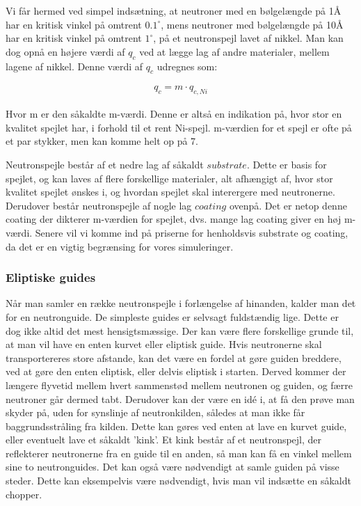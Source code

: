 \documentclass[12pt,oneside,a4paper]{article}
\begin{document}
{{{{{Vi får hermed ved simpel indsætning, at neutroner med en bølgelængde på 1Å har en kritisk vinkel på omtrent $0.1^∘$, mens neutroner med bølgelængde på 10Å har en kritisk vinkel på omtrent $1^∘$, på et neutronspejl lavet af nikkel.
Man kan dog opnå en højere værdi af $q_c$ ved at lægge lag af andre materialer, mellem lagene af nikkel. Denne værdi af $q_c$ udregnes som:

\begin{align}
q_c=m \cdot q_{c,Ni}
\end{align}

Hvor m er den såkaldte m-værdi. Denne er altså en indikation på, hvor stor en kvalitet spejlet har, i forhold til et rent Ni-spejl. m-værdien for et spejl er ofte på et par stykker, men kan komme helt op på 7. \cite{lefmann_arleth_kirkensgaard_lebech_thomsen}

Neutronspejle består af et nedre lag af såkaldt $substrate$. Dette er basis for spejlet, og kan laves af flere forskellige materialer, alt afhængigt af, hvor stor kvalitet spejlet ønskes i, og hvordan spejlet skal interergere med neutronerne. Derudover består neutronspejle af nogle lag $coating$ ovenpå. Det er netop denne coating der dikterer m-værdien for spejlet, dvs. mange lag coating giver en høj m-værdi. Senere vil vi komme ind på priserne for henholdsvis substrate og coating, da det er en vigtig begrænsing for vores simuleringer.

\subsubsection{Eliptiske guides}
Når man samler en række neutronspejle i forlængelse af hinanden, kalder man det for en neutronguide. De simpleste guides er selvsagt fuldstændig lige. Dette er dog ikke altid det mest hensigtsmæssige. Der kan være flere forskellige grunde til, at man vil have en enten kurvet eller eliptisk guide. Hvis neutronerne skal transportereres store afstande, kan det være en fordel at gøre guiden breddere, ved at gøre den enten eliptisk, eller delvis eliptisk i starten. Derved kommer der længere flyvetid mellem hvert sammenstød mellem neutronen og guiden, og færre neutroner går dermed tabt. Derudover kan der være en idé i, at få den prøve man skyder på, uden for synslinje af neutronkilden, således at man ikke får baggrundsstråling fra kilden. Dette kan gøres ved enten at lave en kurvet guide, eller eventuelt lave et såkaldt 'kink'. Et kink består af et neutronspejl, der reflekterer neutronerne fra en guide til en anden, så man kan få en vinkel mellem sine to neutronguides. 
Det kan også være nødvendigt at samle guiden på visse steder. Dette kan eksempelvis være nødvendigt, hvis man vil indsætte en såkaldt chopper.

}}}}}
\end{document}
